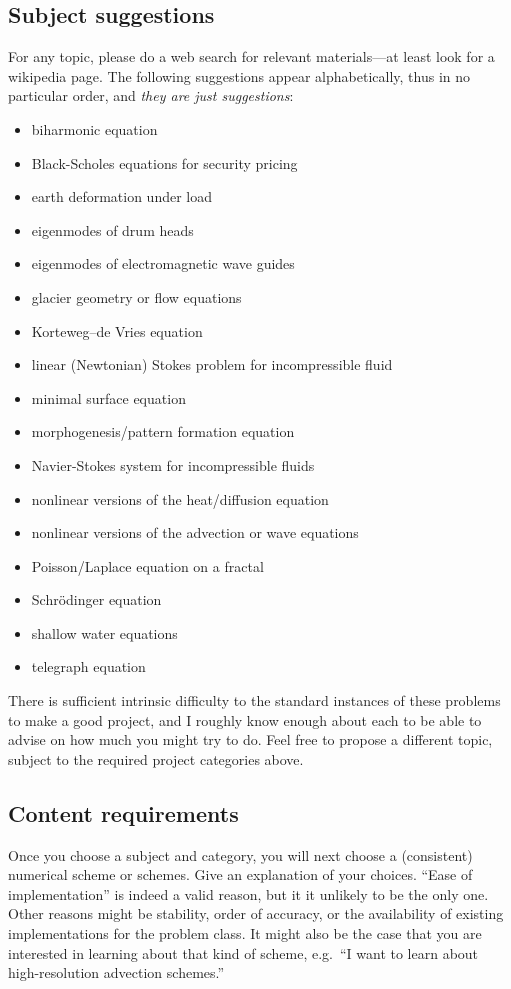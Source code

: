 \documentclass[11pt]{amsart}
\begin{document}
\subsection*{Subject suggestions}  For any topic, please do a web search for relevant materials---at least look for a wikipedia page.  The following suggestions appear alphabetically, thus in no particular order, and \emph{they are just suggestions}:
\begin{itemize}
\item biharmonic equation
\item Black-Scholes equations for security pricing
\item earth deformation under load
\item eigenmodes of drum heads
\item eigenmodes of electromagnetic wave guides
\item glacier geometry or flow equations
\item Korteweg--de Vries equation
\item linear (Newtonian) Stokes problem for incompressible fluid
\item minimal surface equation
\item morphogenesis/pattern formation equation
\item Navier-Stokes system for incompressible fluids
\item nonlinear versions of the heat/diffusion equation
\item nonlinear versions of the advection or wave equations
\item Poisson/Laplace equation on a fractal
\item Schr\"odinger equation
\item shallow water equations
\item telegraph equation
\end{itemize}
There is sufficient intrinsic difficulty to the standard instances of these problems to make a good project, and I roughly know enough about each to be able to advise on how much you might try to do.  Feel free to propose a different topic, subject to the required project categories above.

\subsection*{Content requirements}  Once you choose a subject and category, you will next choose a (consistent) numerical scheme or schemes.  Give an explanation of your choices.  ``Ease of implementation'' is indeed a valid reason, but it it unlikely to be the only one.  Other reasons might be stability, order of accuracy, or the availability of existing implementations for the problem class.  It might also be the case that you are interested in learning about that kind of scheme, e.g.~``I want to learn about high-resolution advection schemes.''
\end{document}
